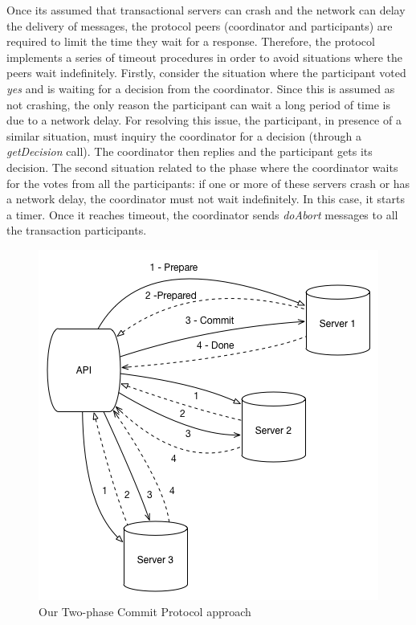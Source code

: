 \documentclass[times, 10pt,twocolumn]{article}
\begin{document}
Once its assumed that transactional servers can crash and the network can delay the delivery of messages, the protocol peers (coordinator and participants) are required to limit the time they wait for a response. Therefore, the protocol implements a series of timeout procedures in order to avoid situations where the peers wait indefinitely. 
Firstly, consider the situation where the participant voted \emph{yes} and is waiting for a decision from the coordinator. Since this is assumed as not crashing, the only reason the participant can wait a long period of time is due to a network delay. For resolving this issue, the participant, in presence of a similar situation, must inquiry the coordinator for a decision (through a \emph{getDecision} call). The coordinator then replies and the participant gets its decision.
The second situation related to the phase where the coordinator waits for the votes from all the participants: if one or more of these servers crash or has a network delay, the coordinator must not wait indefinitely. In this case, it starts a timer. Once it reaches timeout, the coordinator sends \emph{doAbort} messages to all the transaction participants.

\begin{figure}[h!]
	\centering
	\includegraphics[scale=0.45]{2PC.png}
	\caption{Our Two-phase Commit Protocol approach}
\end{figure}

\end{document}
